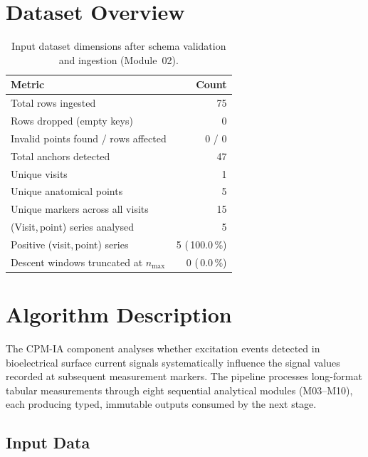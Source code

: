 \documentclass[a4paper,11pt]{article}
\begin{document}
\section{Dataset Overview}

\begin{table}[h!]
\centering
\small
\caption{Input dataset dimensions after schema validation and ingestion (Module~02).}
\begin{tabular}{lr}
\toprule
\textbf{Metric} & \textbf{Count} \\
\midrule
Total rows ingested                        & 75 \\
Rows dropped (empty keys)                  & 0 \\
Invalid points found / rows affected       & 0 / 0 \\
Total anchors detected                     & 47 \\
Unique visits                          & 1 \\
Unique anatomical points               & 5 \\
Unique markers across all visits       & 15 \\
(Visit,\,point) series analysed        & 5 \\
Positive (visit,\,point) series        & 5 (\,100.0\,\%) \\
Descent windows truncated at $n_{\max}$ & 0 (\,0.0\,\%) \\
\bottomrule
\end{tabular}
\end{table}

\section{Algorithm Description}

The CPM-IA component analyses whether excitation events detected in bioelectrical surface
current signals systematically influence the signal values recorded at subsequent measurement
markers. The pipeline processes long-format tabular measurements through eight sequential
analytical modules (M03--M10), each producing typed, immutable outputs consumed by the next
stage.

\subsection{Input Data}
\end{document}
